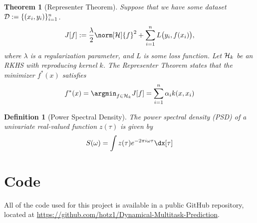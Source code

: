\documentclass[10pt]{article}
\newtheorem{theorem}{Theorem}
\newtheorem{definition}{Definition}
\begin{document}
\begin{theorem}[Representer Theorem]
\label{thm:representer-theorem}
    Suppose that we have some dataset $\mathcal{D} := \{(x_{i}, y_{i})\}_{i=1}^{n}$.
    \begin{equation}
        J[f] := \frac{\lambda}{2}\norm[\calH]{f}^{2} + \sum_{i=1}^{n}L\big(y_{i}, f(x_{i})\big),
    \end{equation}
    where $\lambda$ is a regularization parameter, and $L$ is some loss function. Let $\mathcal{H}_{k}$ be an RKHS with reproducing kernel $k$. The Representer Theorem states that the minimizer $f^{*}(x)$ satisfies
    \begin{equation}
        f^{*}(x) = \argmin_{f \in \calH_{k}}J[f] = \sum_{i=1}^{n}\alpha_{i}k(x, x_{i})
    \end{equation}
\end{theorem}

\begin{definition}[Power Spectral Density]
\label{def:power-spectrum}
    The power spectral density (PSD) of a univariate real-valued function $z(\tau)$ is given by
    \begin{equation}
    \label{eq:PSD-definition}
        S(\omega) = \int z(\tau)e^{-2\pi{i}\omega\tau}\dx[\tau]
    \end{equation}
\end{definition}

\section{Code} 
\label{sec:code} 

All of the code used for this project is available in a public GitHub repository, located at \url{https://github.com/hotz1/Dynamical-Multitask-Prediction}.
\end{document}
